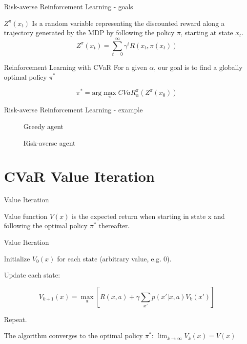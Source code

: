 \documentclass{beamer}
\newcommand{\bsquare}[1]{\left[ {#1} \right]}
\begin{document}
\begin{frame}{Risk-averse Reinforcement Learning - goals}
\begin{definition}
$Z^\pi(x_t)$ Is a random variable representing the discounted reward along a trajectory generated by the MDP by following the policy $\pi$, starting at state $x_t$.
$$Z^\pi(x_{t})=\sum_{t=0}^\infty \gamma^tR(x_t,\pi(x_t))$$
\end{definition}

\begin{block}{Reinforcement Learning with CVaR}
For a given $\alpha$, our goal is to find a globally optimal policy $\pi^*$

$$\pi^* = \text{arg}\max_\pi CVaR^\pi_\alpha(Z^\pi(x_0))$$
\end{block}
\end{frame}


\begin{frame}{Risk-averse Reinforcement Learning - example}
\begin{figure}
    \centering
    \begin{minipage}{0.5\textwidth}
        \centering
        \caption{Greedy agent}
    \end{minipage}\hfill
    \begin{minipage}{0.5\textwidth}
        \centering
        \caption{Risk-averse agent}
    \end{minipage}
\end{figure}
\end{frame}


\section{CVaR Value Iteration}

\begin{frame}{Value Iteration}

\begin{definition}

Value function $V(x)$ is the expected return when starting in state x and following the optimal policy $\pi^*$ thereafter.

\end{definition}

\begin{block}{Value Iteration}

Initialize $V_0(x)$ for each state (arbitrary value, e.g. 0).

Update each state:

$$V_{k+1}(x) = \max_a \bsquare{R(x, a) + \gamma\sum_{x'}  p(x'|x, a) V_k(x')}$$

Repeat.
\end{block}

The algorithm converges to the optimal policy $\pi^*$: $\lim_{k\to\infty}V_k(x) = V(x)$

\end{frame}
\end{document}
